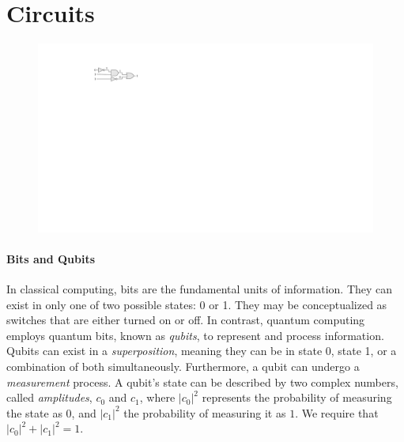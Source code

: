 \section{Circuits} 
\begin{figure} 
\includegraphics[]{Figures/HWCircuits/DigitalCircuit} 
\end{figure}

\newcommand\bstate{b}
\newcommand\qustate{q}

\paragraph{Bits and Qubits}
In classical computing, bits are the fundamental units of information. 
%
They can exist in only one of two possible states: 0 or 1. 
%
They may be conceptualized as switches that are either turned on or off. 
%
In contrast, quantum computing employs quantum bits, known as {\it qubits}, to represent and process information. 
%
Qubits can exist in a {\it superposition}, meaning they can be in state 0, state 1, or a combination of both simultaneously. 
%
Furthermore, a qubit can undergo a {\it measurement} process. 
%
A qubit’s state can be described by two complex numbers, called {\it amplitudes}, $c_0$ and $c_1$, where $|c_0|^2$ represents the probability of measuring the state as $0$, and $|c_1|^2$ the probability of measuring it as $1$. 
%
We require that $|c_0|^2 + |c_1|^2 = 1$.

